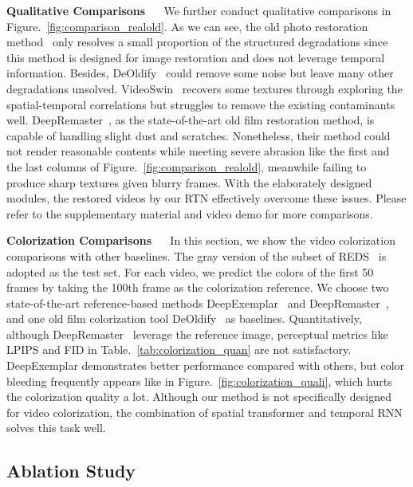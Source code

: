 \documentclass[10pt,twocolumn,letterpaper]{article}
\begin{document}
	
	
	
	\noindent\textbf{Qualitative Comparisons} ~~ We further conduct qualitative comparisons in Figure.~\ref{fig:comparison_realold}. As we can see, the old photo restoration method~\cite{wan2020bringing} only resolves a small proportion of the structured degradations since this method is designed for image restoration and does not leverage temporal information. Besides, DeOldify~\cite{DeOldify} could remove some noise but leave many other degradations unsolved. VideoSwin~\cite{liu2021video} recovers some textures through exploring the spatial-temporal correlations but struggles to remove the existing contaminants well. DeepRemaster~\cite{iizuka2019deepremaster}, as the state-of-the-art old film restoration method, is capable of handling slight dust and scratches. Nonetheless, their method could not render reasonable contents while meeting severe abrasion like the first and the last columns of Figure.~\ref{fig:comparison_realold}, meanwhile failing to produce sharp textures given blurry frames. With the elaborately designed modules, the restored videos by our RTN effectively overcome these issues. Please refer to the supplementary material and video demo for more comparisons.
	
	
	\noindent\textbf{Colorization Comparisons} ~~ In this section, we show the video colorization comparisons with other baselines. The gray version of the subset of REDS~\cite{Nah_2019_CVPR_Workshops_REDS} is adopted as the test set. For each video, we predict the colors of the first 50 frames by taking the 100th frame as the colorization reference. We choose two state-of-the-art reference-based methods DeepExemplar~\cite{zhang2019deep} and DeepRemaster~\cite{iizuka2019deepremaster}, and one old film colorization tool DeOldify~\cite{DeOldify} as baselines. Quantitatively, although DeepRemaster~\cite{iizuka2019deepremaster} leverage the reference image, perceptual metrics like LPIPS and FID in Table.~\ref{tab:colorization_quan} are not satisfactory. DeepExemplar demonstrates better performance compared with others, but color bleeding frequently appears like in Figure.~\ref{fig:colorization_quali}, which hurts the colorization quality a lot. Although our method is not specifically designed for video colorization, the combination of spatial transformer and temporal RNN solves this task well.
	
	\subsection{Ablation Study}
	
\end{document}

